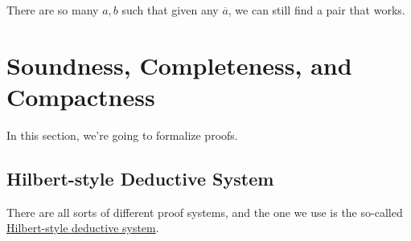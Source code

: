 \begin{intuition}
	There are so many \(a, b\) such that given any \(\overline{a} \), we can still find a pair that works.
\end{intuition}

\section{Soundness, Completeness, and Compactness}
In this section, we're going to formalize proofs.

\subsection{Hilbert-style Deductive System}
There are all sorts of different proof systems, and the one we use is the so-called \hyperref[def:Hilbert-style-deductive-system]{Hilbert-style deductive system}.

